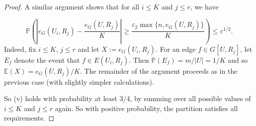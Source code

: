 \documentclass{memo-l}
\def\COMMENT#1{}
\def\eps{\varepsilon}
\def\ex{\mathbb{E}}
\def\pr{\mathbb{P}}
\numberwithin{section}{chapter}
\numberwithin{equation}{section}
\numberwithin{firstthm}{section}
\numberwithin{figure}{section}
\begin{document}
\begin{proof}
 
A similar argument shows that for all $i \le K$ and $j \le r$, we have%
    \COMMENT{
Fix $i \le K$, $j \le r$ and let $X:= e_G(U_i, R_j)$.
For an edge $f$, let $E_f$ denote the event that $f \in E(U_i, R_j)$.
Note $\pr (E_f)=m/|U|=1/K$ and that if $f,f'$ have different endpoints in $U$, we have
$\pr ( E_{f'} \mid E_f )= \frac{m-1}{|U|-1} \le \frac{m}{|U|} =\pr(E_f).
$
Clearly, $\ex ( X ) = e_G(U, R_j) /K$.
Also let $\Delta'(U,R_j))=\max_{u \in U} d (u,R_j)$.
Note that
\begin{eqnarray*}
\textrm{Var} ( X ) 
                & = & \sum_{f \in E(U,R_j)} \pr ( E_f ) \sum_{f' \in E(U,R_j)}  \left( \pr ( E_{f'}) | E_f )  -    \pr ( E_{f'} ) \right) \\       
                & \le & \sum_{f \in E(U,R_j)} \pr ( E_f )\Delta' (U,R_j) \le  \frac{e_G(U,R_j)}{K}  \cdot \Delta' (U,R_j)
\le  e_G(U,R_j)  \Delta' (U,R_j).
\end{eqnarray*}
Let $a:=e_G(U,R_j)\Delta' (U,R_j)$. From Chebyshev's inequality, it follows that
\begin{align}
\pr \left( | X- \ex(X) |  \ge \sqrt{ a/\eps^{1/2} } \right) \le \eps^{1/2}.  \nonumber
\end{align}
Suppose that $\Delta' (U,R_j) \le \eps n$.
If we also have have $e_G(U,R_j) \le  n$, then 
$\sqrt{ a/\eps^{1/2} } \le  \eps^{1/4} n \le \eps_2n/K$.
If $e_G(U,R_j) \ge n$, then $\sqrt{ a/ \eps^{1/2} } \le  \eps^{1/4} e_G(U,R_j) \le \eps_2 e_G(U,R_j)/K$.
If we do not have $\Delta' (U,R_j) \le \eps n$, then our assumptions imply that $d_G(x,U) \ge \eps n$
for every $x \in R_j$.
So $\Delta'(U,R_j) \le |R_j| \le \eps e_G(U,R_j)$ with room to spare.
This in turn means that $\sqrt{ a/ \eps^{1/2} } \le \eps^{1/4} e_G(U,R_j) \le \eps_2 e_G(U,R_j)/K$.
}
\begin{equation} \label{eqn:preUR}
                \pr \left(  \left| e_G(U_i, R_j) - \frac{e_G(U,R_j)}{K} \right| \ge  \frac{\eps_2 \max \{ n, e_G(U,R_j)\} }{K} \right)
\le \eps^{1/2}.  
\end{equation}
Indeed, fix $i \le K$, $j \le r$ and let $X:= e_G(U_i, R_j)$.
For an edge $f \in G[U,R_j]$, let $E_f$ denote the event that $f \in E(U_i, R_j)$.
Then $\pr (E_f)=m/|U|=1/K$ and so $\ex ( X ) = e_G(U, R_j) /K$.
The remainder of the argument proceeds as in the previous case
(with slightly simpler calculations).
 
So (v) holds with probability at least 3/4, by summing over all possible values of $i \le K$ and $j \le r$ again.
So with positive probability, the partition satisfies all requirements.
\end{proof}
\end{document}
